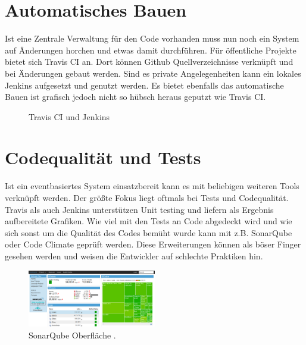 \section{Automatisches Bauen}
Ist eine Zentrale Verwaltung für den Code vorhanden muss nun noch ein System auf Änderungen horchen und etwas damit durchführen. Für öffentliche Projekte bietet sich Travis CI \cite{travisci} an. Dort können Github Quellverzeichnisse verknüpft und bei Änderungen gebaut werden. Sind es private Angelegenheiten kann ein lokales Jenkins \cite{jenkins} aufgesetzt und genutzt werden. Es bietet ebenfalls das automatische Bauen ist grafisch jedoch nicht so hübsch heraus geputzt wie Travis CI.
\begin{figure}[htb!]
	\hfill
	\caption{Travis CI  \cite{travisci} und Jenkins \cite{jenkins}}
	\label{travisci-jenkins}
\end{figure}

\section{Codequalität und Tests}
Ist ein eventbasiertes System einsatzbereit kann es mit beliebigen weiteren Tools verknüpft werden. Der größte Fokus liegt oftmals bei Tests und Codequalität. Travis als auch Jenkins unterstützen Unit testing und liefern als Ergebnis aufbereitete Grafiken. Wie viel mit den Tests an Code abgedeckt wird und wie sich sonst um die Qualität des Codes bemüht wurde kann mit z.B. SonarQube \cite{sonarqube} oder Code Climate \cite{code-climate} geprüft werden. Diese Erweiterungen können als böser Finger gesehen werden und weisen die Entwickler auf schlechte Praktiken hin.

\begin{figure}[!htb]
	\centerline{\includegraphics[width=0.5\textwidth]{img/SonarQube}}
	\caption{SonarQube Oberfläche \cite{sonarqube}.}
	\label{sonarqube}
\end{figure}

